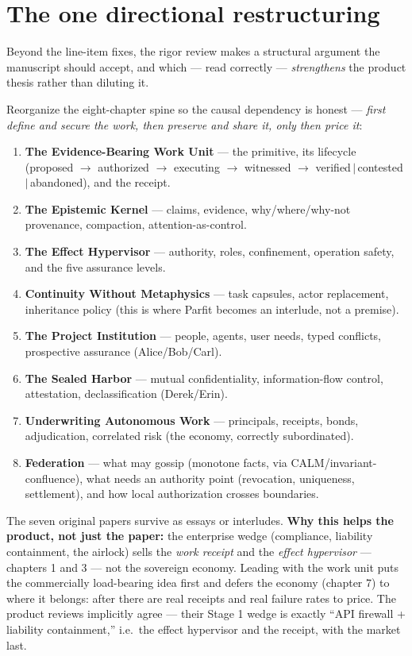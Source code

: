 \documentclass[11pt,a4paper]{article}
\begin{document}
\section{The one directional restructuring}
Beyond the line-item fixes, the rigor review makes a structural argument the manuscript should accept, and which --- read correctly --- \emph{strengthens} the product thesis rather than diluting it.

\begin{move}
Reorganize the eight-chapter spine so the causal dependency is honest --- \emph{first define and secure the work, then preserve and share it, only then price it}:
\begin{enumerate}[leftmargin=1.5em]
\item \textbf{The Evidence-Bearing Work Unit} --- the primitive, its lifecycle (proposed $\to$ authorized $\to$ executing $\to$ witnessed $\to$ verified\,$\mid$\,contested\,$\mid$\,abandoned), and the receipt.
\item \textbf{The Epistemic Kernel} --- claims, evidence, why/where/why-not provenance, compaction, attention-as-control.
\item \textbf{The Effect Hypervisor} --- authority, roles, confinement, operation safety, and the five assurance levels.
\item \textbf{Continuity Without Metaphysics} --- task capsules, actor replacement, inheritance policy (this is where Parfit becomes an interlude, not a premise).
\item \textbf{The Project Institution} --- people, agents, user needs, typed conflicts, prospective assurance (Alice/Bob/Carl).
\item \textbf{The Sealed Harbor} --- mutual confidentiality, information-flow control, attestation, declassification (Derek/Erin).
\item \textbf{Underwriting Autonomous Work} --- principals, receipts, bonds, adjudication, correlated risk (the economy, correctly subordinated).
\item \textbf{Federation} --- what may gossip (monotone facts, via CALM/invariant-confluence), what needs an authority point (revocation, uniqueness, settlement), and how local authorization crosses boundaries.
\end{enumerate}
The seven original papers survive as essays or interludes. \textbf{Why this helps the product, not just the paper:} the enterprise wedge (compliance, liability containment, the airlock) sells the \emph{work receipt} and the \emph{effect hypervisor} --- chapters 1 and 3 --- not the sovereign economy. Leading with the work unit puts the commercially load-bearing idea first and defers the economy (chapter 7) to where it belongs: after there are real receipts and real failure rates to price. The product reviews implicitly agree --- their Stage 1 wedge is exactly ``API firewall + liability containment,'' i.e.\ the effect hypervisor and the receipt, with the market last.
\end{move}
\end{document}
